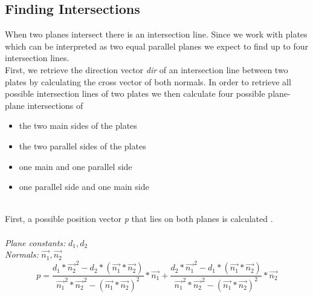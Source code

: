 \documentclass[../ClassicThesis.tex]{subfiles}
\begin{document}
\subsection{Finding Intersections}\label{findIntersections}
When two planes intersect there is an intersection line. Since we work with plates which can be interpreted as two equal parallel planes we expect to find up to four intersection lines.\\
First, we retrieve the direction vector \emph{dir} of an intersection line between two plates by calculating the cross vector of both normals. In order to retrieve all possible intersection lines of two plates we then calculate four possible plane-plane intersections of 
\begin{itemize}
\item the two main sides of the plates
\item the two parallel sides of the plates
\item one main and one parallel side 
\item one parallel side and one main side
\end{itemize}
\*\\
First, a possible position vector \emph{p} that lies on both planes is calculated \cite{positionVectorRetrieval}.
\\\*\\
\emph{Plane constants:} $d_1, d_2$\\
\emph{Normals:} $\vec{n_1}, \vec{n_2}$
$$ p = \frac{d_1 * \vec{n_{2}}^{2} - d_2 * (\vec{n_1} * \vec{n_2})}{\vec{n_{1}}^{2} * \vec{n_{2}}^{2} - (\vec{n_1} * \vec{n_2})^{2}} * \vec{n_1} + \frac{d_2*\vec{n_1}^2 - d_1*(\vec{n_1} * \vec{n_2})}{\vec{n_1}^2 * \vec{n_2}^2 - (\vec{n_1} * \vec{n_2})^2} * \vec{n_2} $$
\end{document}

